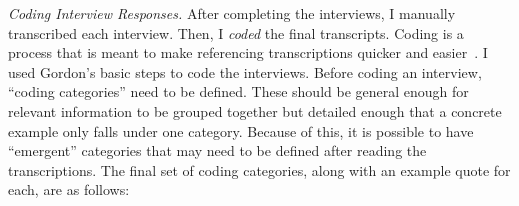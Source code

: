 \documentclass{llncs}
\begin{document}
\vspace{0.5em}
\noindent\textit{Coding Interview Responses.}
After completing the interviews, I manually transcribed each interview. Then, I \textit{coded} the final transcripts. Coding is a process that is meant to make referencing transcriptions quicker and
easier~\cite{Gordon:1998:Coding}. I used Gordon's basic steps to code the interviews. Before coding an interview, ``coding categories'' need to be defined. These should be general enough for relevant information to be grouped together but detailed enough that a concrete example only falls under one category. Because of this, it is possible to have ``emergent'' categories that may need to be defined after reading the transcriptions. The final set of coding categories, along with an example quote for each, are as follows: 
\end{document}
